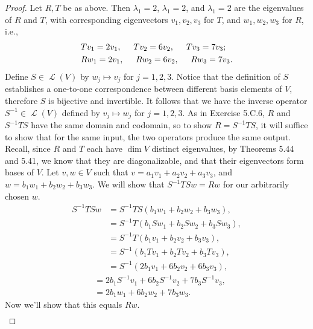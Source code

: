 \documentclass[letterpaper, 12pt]{amsart}
\DeclareMathOperator{\Ell}{\mathscr{L}}				%
\theoremstyle{definition}  							%
\begin{document}
		\begin{proof}
		Let $R,T$ be as above.
		Then $\lambda_{1} = 2$, $\lambda_{1} = 2$, and $\lambda_{1} = 2$ are the eigenvalues of $R$ and $T$, with corresponding eigenvectors $v_{1}, v_{2}, v_{3}$ for $T$, and $w_{1}, w_{2}, w_{3}$ for $R$, i.e.,
			\begin{align*}
				&Tv_{1} = 2v_{1}, \hspace{5mm} Tv_{2} = 6v_{2}, \hspace{5mm} Tv_{3} = 7v_{3}; \\
				&Rw_{1} = 2v_{1}, \hspace{5mm} Rw_{2} = 6v_{2}, \hspace{5mm} Rw_{3} = 7v_{3}.
			\end{align*}
		Define $S \in \Ell(V)$ by $w_{j} \mapsto v_{j}$ for $j = 1,2,3$.
		Notice that the definition of $S$ establishes a one-to-one correspondence between different basis elements of $V$, therefore $S$ is bijective and invertible.
		It follows that we have the inverse operator $S^{-1} \in \Ell(V)$ defined by $v_{j} \mapsto w_{j}$ for $j = 1,2,3$.
		As in Exercise 5.C.6, $R$ and $S^{-1}TS$ have the same domain and codomain, so to show $R = S^{-1}TS$, it will suffice to show that for the same input, the two operators produce the same output.
		Recall, since $R$ and $T$ each have $\dim V$ distinct eigenvalues, by Theorems 5.44 and 5.41, we know that they are diagonalizable, and that their eigenvectors form bases of $V$.
		Let $v,w \in V$ such that $v = a_{1}v_{1} + a_{2}v_{2} + a_{3}v_{3}$, and $w = b_{1}w_{1} + b_{2}w_{2} + b_{3}w_{3}$.
		We will show that $S^{-1}TSw = Rw$ for our arbitrarily chosen $w$.
			\begin{align*}
				S^{-1}TSw &= S^{-1}TS(b_{1}w_{1} + b_{2}w_{2} + b_{3}w_{3}), \\
				&= S^{-1} T(b_{1}Sw_{1} + b_{2}Sw_{2} + b_{3}Sw_{3}), \\
				&= S^{-1} T(b_{1}v_{1} + b_{2}v_{2} + b_{3}v_{3}), \\
				&= S^{-1}(b_{1}Tv_{1} + b_{2}Tv_{2} + b_{3}Tv_{3}), \\
				&= S^{-1}(2b_{1}v_{1} + 6b_{2}v_{2} + 6b_{3}v_{3}), 
			\end{align*}
			\begin{align*}
				&= 2b_{1}S^{-1}v_{1} + 6b_{2}S^{-1}v_{2} + 7b_{3}S^{-1}v_{3}, \\
				&= 2b_{1}w_{1} + 6b_{2}w_{2} + 7b_{3}w_{3}.
			\end{align*}
		Now we'll show that this equals $Rw$.
			\begin{align*}

\end{align*}
\end{proof}
\end{document}
